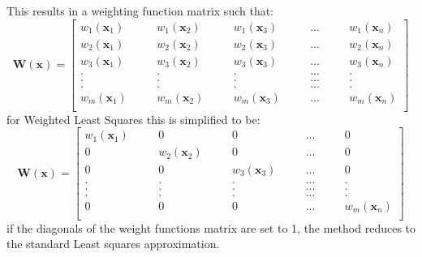 \documentclass[12pt]{extarticle}
\begin{document}
This results in a weighting function matrix such that:
\begin{equation*}
\textbf{W}(\textbf{x})= 
  \begin{bmatrix}
    w_1(\textbf{x}_1) & \quad  & w_1(\textbf{x}_2) & \quad  & w_1(\textbf{x}_3) & \quad & ... & \quad & w_1(\textbf{x}_n) \\
    w_2(\textbf{x}_1) & \quad  & w_2(\textbf{x}_2) & \quad  & w_2(\textbf{x}_3) & \quad & ... & \quad & w_2(\textbf{x}_n) \\
    w_3(\textbf{x}_1) & \quad  & w_3(\textbf{x}_2) & \quad  & w_3(\textbf{x}_3) & \quad & ... & \quad & w_3(\textbf{x}_n) \\
    . & \quad  & . & \quad  & . & \quad & ... & \quad & . \\
    . & \quad  & . & \quad  & . & \quad & ... & \quad & . \\
    . & \quad  & . & \quad  & . & \quad & ... & \quad & . \\
      w_m(\textbf{x}_1) & \quad  & w_m(\textbf{x}_2) & \quad  & w_m(\textbf{x}_3) & \quad & ... & \quad & w_m(\textbf{x}_n) \\
  \end{bmatrix}
\end{equation*}
for Weighted Least Squares this is simplified to be:
\begin{equation*}
\textbf{W}(\textbf{x})= 
  \begin{bmatrix}
    w_1(\textbf{x}_1) & \quad  & 0 & \quad  & 0 & \quad & ... & \quad & 0 \\
    0 & \quad  & w_2(\textbf{x}_2) & \quad  & 0 & \quad & ... & \quad & 0 \\
    0 & \quad  & 0 & \quad  & w_3(\textbf{x}_3) & \quad & ... & \quad & 0 \\
    . & \quad  & . & \quad  & . & \quad & ... & \quad & . \\
    . & \quad  & . & \quad  & . & \quad & ... & \quad & . \\
    . & \quad  & . & \quad  & . & \quad & ... & \quad & . \\
      0 & \quad  & 0 & \quad  & 0 & \quad & ... & \quad & w_m(\textbf{x}_n) \\
  \end{bmatrix}
\end{equation*}
if the diagonals of the weight functions matrix are set to 1, the method reduces to the standard Least squares approximation.
\begin{equation}
  \label{eq038}
\end{equation}
\end{document}
